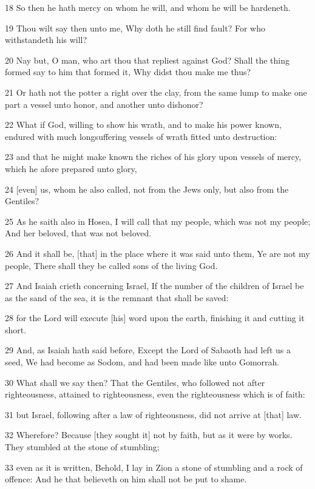 \par 18 So then he hath mercy on whom he will, and whom he will be hardeneth.
\par 19 Thou wilt say then unto me, Why doth he still find fault? For who withstandeth his will?
\par 20 Nay but, O man, who art thou that repliest against God? Shall the thing formed say to him that formed it, Why didst thou make me thus?
\par 21 Or hath not the potter a right over the clay, from the same lump to make one part a vessel unto honor, and another unto dishonor?
\par 22 What if God, willing to show his wrath, and to make his power known, endured with much longsuffering vessels of wrath fitted unto destruction:
\par 23 and that he might make known the riches of his glory upon vessels of mercy, which he afore prepared unto glory,
\par 24 [even] us, whom he also called, not from the Jews only, but also from the Gentiles?
\par 25 As he saith also in Hosea, I will call that my people, which was not my people; And her beloved, that was not beloved.
\par 26 And it shall be, [that] in the place where it was said unto them, Ye are not my people, There shall they be called sons of the living God.
\par 27 And Isaiah crieth concerning Israel, If the number of the children of Israel be as the sand of the sea, it is the remnant that shall be saved:
\par 28 for the Lord will execute [his] word upon the earth, finishing it and cutting it short.
\par 29 And, as Isaiah hath said before, Except the Lord of Sabaoth had left us a seed, We had become as Sodom, and had been made like unto Gomorrah.
\par 30 What shall we say then? That the Gentiles, who followed not after righteousness, attained to righteousness, even the righteousness which is of faith:
\par 31 but Israel, following after a law of righteousness, did not arrive at [that] law.
\par 32 Wherefore? Because [they sought it] not by faith, but as it were by works. They stumbled at the stone of stumbling;
\par 33 even as it is written, Behold, I lay in Zion a stone of stumbling and a rock of offence: And he that believeth on him shall not be put to shame.

